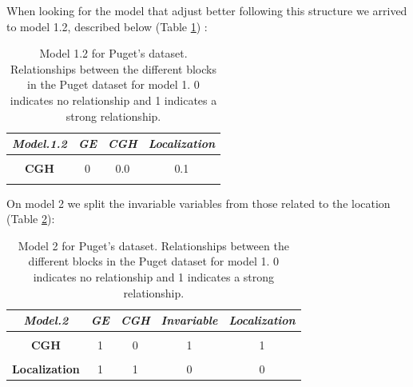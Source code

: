 \documentclass[
  12pt,
  a4paper,
  twoside,
  openright]{book}
\begin{document}
When looking for the model that adjust better following this structure we arrived to model 1.2, described below (Table \ref{tab:puget-model1-2}) :

\begin{table}[H]

\caption[Model 1.2 for the Puget's dataset.]{\label{tab:puget-model1-2}Model 1.2 for Puget's dataset. Relationships between the different blocks in the Puget dataset for model 1. 0 indicates no relationship and 1 indicates a strong relationship.}
\centering
\begin{tabular}[t]{|>{}c|c|c|>{}c|}
\hline
\em{\textbf{Model.1.2}} & \em{\textbf{GE}} & \em{\textbf{CGH}} & \em{\textbf{Localization}}\\
\hline
\textbf{\cellcolor{gray!6}{GE}} & \cellcolor{gray!6}{0} & \cellcolor{gray!6}{0.0} & \cellcolor{gray!6}{1.0}\\
\hline
\textbf{CGH} & 0 & 0.0 & 0.1\\
\hline
\textbf{\cellcolor{gray!6}{Localization}} & \cellcolor{gray!6}{1} & \cellcolor{gray!6}{0.1} & \cellcolor{gray!6}{0.0}\\
\hline
\end{tabular}
\end{table}

On model 2 we split the invariable variables from those related to the location (Table \ref{tab:puget-model2}):

\begin{table}[H]

\caption[Model 2 for the Puget's dataset.]{\label{tab:puget-model2}Model 2 for Puget's dataset. Relationships between the different blocks in the Puget dataset for model 1. 0 indicates no relationship and 1 indicates a strong relationship.}
\centering
\begin{tabular}[t]{|>{}c|c|c|c|>{}c|}
\hline
\em{\textbf{Model.2}} & \em{\textbf{GE}} & \em{\textbf{CGH}} & \em{\textbf{Invariable}} & \em{\textbf{Localization}}\\
\hline
\textbf{\cellcolor{gray!6}{GE}} & \cellcolor{gray!6}{0} & \cellcolor{gray!6}{1} & \cellcolor{gray!6}{1} & \cellcolor{gray!6}{1}\\
\hline
\textbf{CGH} & 1 & 0 & 1 & 1\\
\hline
\textbf{\cellcolor{gray!6}{Invariable}} & \cellcolor{gray!6}{1} & \cellcolor{gray!6}{1} & \cellcolor{gray!6}{0} & \cellcolor{gray!6}{0}\\
\hline
\textbf{Localization} & 1 & 1 & 0 & 0\\
\hline
\end{tabular}
\end{table}
\end{document}
